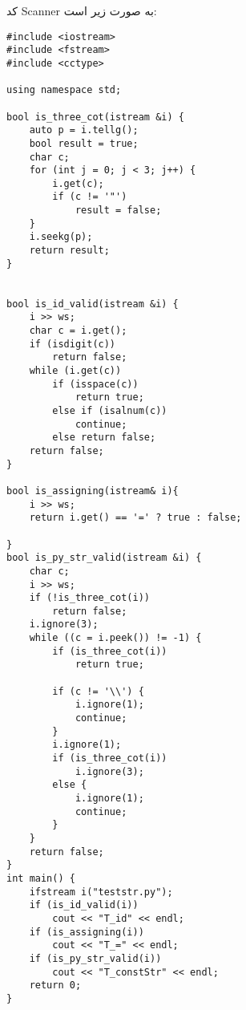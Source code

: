 کد Scanner به صورت زیر است:

\begin{latin}
    \begin{lstlisting}
#include <iostream>
#include <fstream>
#include <cctype>

using namespace std;

bool is_three_cot(istream &i) {
    auto p = i.tellg();
    bool result = true;
    char c;
    for (int j = 0; j < 3; j++) {
        i.get(c);
        if (c != '"')
            result = false;
    }
    i.seekg(p);
    return result;
}


bool is_id_valid(istream &i) {
    i >> ws;
    char c = i.get();
    if (isdigit(c))
        return false;
    while (i.get(c))
        if (isspace(c))
            return true;
        else if (isalnum(c))
            continue;
        else return false;
    return false;
}

bool is_assigning(istream& i){
    i >> ws;
    return i.get() == '=' ? true : false;

}
bool is_py_str_valid(istream &i) {
    char c;
    i >> ws;
    if (!is_three_cot(i))
        return false;
    i.ignore(3);
    while ((c = i.peek()) != -1) {
        if (is_three_cot(i))
            return true;

        if (c != '\\') {
            i.ignore(1);
            continue;
        }
        i.ignore(1);
        if (is_three_cot(i))
            i.ignore(3);
        else {
            i.ignore(1);
            continue;
        }
    }
    return false;
}
int main() {
    ifstream i("teststr.py");
    if (is_id_valid(i))
        cout << "T_id" << endl;
    if (is_assigning(i))
        cout << "T_=" << endl;
    if (is_py_str_valid(i))
        cout << "T_constStr" << endl;
    return 0;
}
    \end{lstlisting}
\end{latin}
